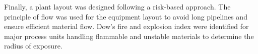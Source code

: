 Finally, a plant layout was designed following a risk-based approach. The principle of flow was used for the equipment layout to avoid long pipelines and ensure efficient material flow. Dow’s fire and explosion index were identified for major process units handling flammable and unstable materials to determine the radius of exposure.  